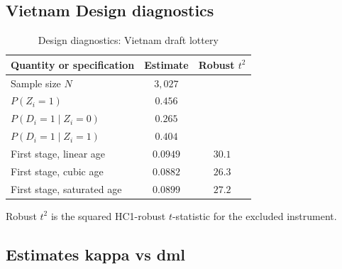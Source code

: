 \documentclass[12pt, a4paper, oneside]{article}
\theoremstyle{plain}
\theoremstyle{definition}
\begin{document}
\subsection{Vietnam Design diagnostics}
\begin{table}[H]
\centering
\caption{Design diagnostics: Vietnam draft lottery}
\label{tab:vietnam_descr}
\begin{threeparttable}
\begin{tabular}{@{}lcc@{}}
\toprule
Quantity or specification & Estimate & Robust \(t^2\) \\
\midrule
Sample size \(N\)                              & \(3{,}027\) &  \\
\(P(Z_i=1)\)                                   & \(0.456\)   &  \\
\(P(D_i=1\mid Z_i=0)\)                         & \(0.265\)   &  \\
\(P(D_i=1\mid Z_i=1)\)                         & \(0.404\)   &  \\
\addlinespace
First stage, linear age                        & \(0.0949\)  & \(30.1\) \\
First stage, cubic age                         & \(0.0882\)  & \(26.3\) \\
First stage, saturated age                     & \(0.0899\)  & \(27.2\) \\
\bottomrule
\end{tabular}
\begin{tablenotes}
\footnotesize
\item Robust \(t^2\) is the squared HC1-robust \(t\)-statistic for the excluded
instrument.
\end{tablenotes}
\end{threeparttable}
\end{table}


\subsection{Estimates kappa vs dml}
\end{document}
